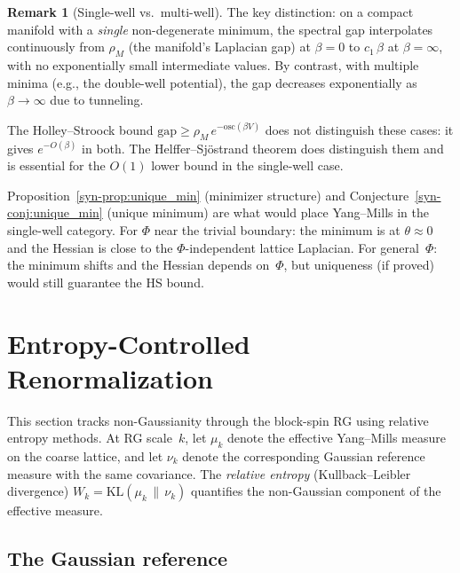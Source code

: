 \documentclass[11pt]{article}
\theoremstyle{definition}
\newtheorem{remark}[theorem]{Remark}
\newcommand{\KL}{\mathrm{KL}}
\newcommand{\osc}{\mathrm{osc}}
\newcommand{\gap}{\mathrm{gap}}
\begin{document}
\begin{remark}[Single-well vs.\ multi-well]\label{syn-rem:mechanism}
The key distinction: on a compact manifold with a
\emph{single} non-degenerate minimum, the spectral gap
interpolates continuously from $\rho_M$ (the manifold's
Laplacian gap) at $\beta = 0$ to $c_1\,\beta$ at
$\beta = \infty$, with no exponentially small intermediate
values.  By contrast, with multiple minima (e.g., the
double-well potential), the gap decreases exponentially as
$\beta \to \infty$ due to tunneling.

The Holley--Stroock bound $\gap \geq \rho_M\,e^{-\osc(\beta V)}$
does not distinguish these cases: it gives $e^{-O(\beta)}$
in both.  The Helffer--Sj\"ostrand theorem does distinguish
them and is essential for the $O(1)$ lower bound in the
single-well case.

Proposition~\ref{syn-prop:unique_min} (minimizer structure) and
Conjecture~\ref{syn-conj:unique_min} (unique minimum) are what
would place Yang--Mills in the single-well category.
For $\Phi$ near the trivial boundary: the minimum is at
$\theta \approx 0$ and the Hessian is close to the
$\Phi$-independent lattice Laplacian.  For general~$\Phi$:
the minimum shifts and the Hessian depends on~$\Phi$, but
uniqueness (if proved) would still guarantee the HS bound.
\end{remark}



\section{Entropy-Controlled Renormalization}\label{sec:entropy-rg}

This section tracks non-Gaussianity
through the block-spin RG using relative entropy methods.
At RG scale~$k$, let $\mu_k$ denote the effective Yang--Mills
measure on the coarse lattice, and let $\nu_k$ denote the
corresponding Gaussian reference measure with the same covariance.
The \emph{relative entropy} (Kullback--Leibler divergence)
$W_k=\KL(\mu_k\,\|\,\nu_k)$ quantifies the non-Gaussian
component of the effective measure.

\subsection{The Gaussian reference}
\end{document}
